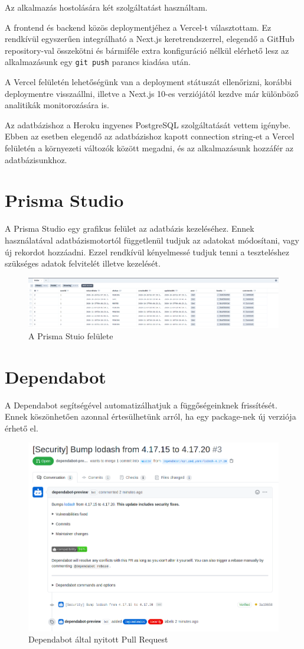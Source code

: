 Az alkalmazás hostolására két szolgáltatást használtam.

A frontend és backend közös deploymentjéhez a Vercel-t választottam. Ez rendkívül egyszerűen integrálható a Next.js keretrendszerrel,
elegendő a GitHub repository-val összekötni és bármiféle extra konfiguráció nélkül elérhető lesz az alkalmazásunk egy \lstinline|git push| parancs kiadása után.

A Vercel felületén lehetőségünk van a deployment státuszát ellenőrizni, korábbi deploymentre visszaállni, illetve a Next.js 10-es verziójától kezdve
már különböző analitikák monitorozására is.

Az adatbázishoz a Heroku ingyenes PostgreSQL szolgáltatását vettem igénybe. Ebben az esetben elegendő az adatbázishoz kapott
connection string-et a Vercel felületén a környezeti változók között megadni, és az alkalmazásunk hozzáfér az adatbázisunkhoz.

\section{Prisma Studio}

A Prisma Studio egy grafikus felület az adatbázis kezeléséhez. Ennek használatával adatbázismotortól függetlenül tudjuk
az adatokat módosítani, vagy új rekordot hozzáadni. Ezzel rendkívül kényelmessé tudjuk tenni a teszteléshez szükséges
adatok felvitelét illetve kezelését.

\begin{figure}[!ht]
  \centering
  \includegraphics[width=150mm, keepaspectratio]{figures/prisma-studio.png}
  \caption{A Prisma Stuio felülete}
  \label{fig:PrismaStudio}
\end{figure}

\section{Dependabot}

A Dependabot segítségével automatizálhatjuk a függőségeinknek frissítését. Ennek köszönhetően azonnal értesülhetünk
arról, ha egy package-nek új verziója érhető el.

\begin{figure}[!ht]
  \centering
  \includegraphics[width=125mm, keepaspectratio]{figures/dependabot-pr.png}
  \caption{Dependabot által nyitott Pull Request}
  \label{fig:Dependabot}
\end{figure}
